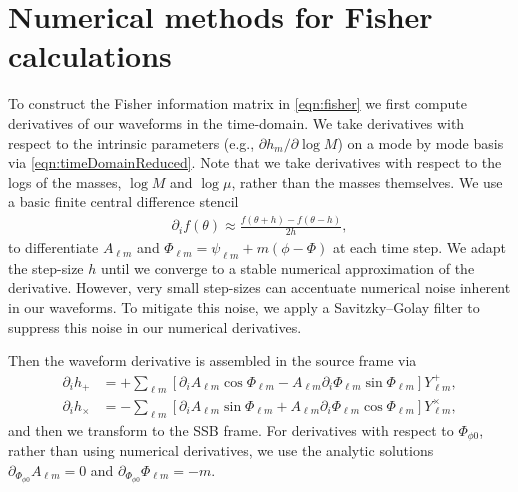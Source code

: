 \documentclass[%
 reprint,
 nofootinbib,
 amsmath,amssymb,
 aps,
 prd,
]{revtex4-2}
\begin{document}
\section{Numerical methods for Fisher calculations}
\label{app:fisher}

To construct the Fisher information matrix in \eqref{eqn:fisher} we first compute derivatives of our waveforms in the time-domain. We take derivatives with respect to the intrinsic parameters (e.g., $\partial h_m /\partial\log M$) on a mode by mode basis via \eqref{eqn:timeDomainReduced}. Note that we take derivatives with respect to the logs of the masses, $\log M$ and $\log \mu$, rather than the masses themselves. We use a basic finite central difference stencil
\begin{align}
    \partial_i f(\theta) \approx \frac{f(\theta + h) - f(\theta - h)}{2h},
\end{align}
to differentiate $A_{\ell m}$ and $\Phi_{\ell m} = \psi_{\ell m} + m(\phi - \Phi)$ at each time step. We adapt the step-size $h$ until we converge to a stable numerical approximation of the derivative. However, very small step-sizes can accentuate numerical noise inherent in our waveforms. To mitigate this noise, we apply a Savitzky–Golay filter to suppress this noise in our numerical derivatives.

Then the waveform derivative is assembled in the source frame via
\begin{subequations} \label{eqn:timeDomainDerivatives}
    \begin{align}
    \partial_i h_+ &= +\sum_{\ell m} \left[ \partial_i A_{\ell m} \cos\Phi_{\ell m} - A_{\ell m} \partial_i \Phi_{\ell m} \sin\Phi_{\ell m}\right] Y^+_{\ell m},
    \\
    \partial_i h_\times &= -\sum_{\ell m} \left[ \partial_i A_{\ell m} \sin\Phi_{\ell m} + A_{\ell m} \partial_i \Phi_{\ell m} \cos\Phi_{\ell m}\right] Y^\times_{\ell m},
    \end{align}
\end{subequations}
and then we transform to the SSB frame. For derivatives with respect to $\Phi_{\phi 0}$, rather than using numerical derivatives, we use the analytic solutions $\partial_{\Phi_{\phi 0}} A_{\ell m} = 0$ and $\partial_{\Phi_{\phi 0}} \Phi_{\ell m} = -m$. 
\end{document}
